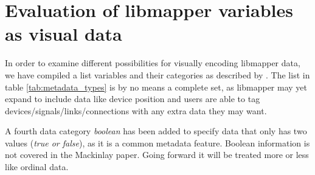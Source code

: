 
\section{Evaluation of libmapper variables as visual data} %
\label{sec:evaluation_of_libmapper_variables}

In order to examine different possibilities for visually encoding libmapper data, we have compiled a list variables and their categories as described by . The list in table \ref{tab:metadata_types} is by no means a complete set, as libmapper may yet expand to include data like device position and users are able to tag devices/signals/links/connections with any extra data they may want.

A fourth data category \emph{boolean} has been added to specify data that only has two values (\emph{true or false}), as it is a common metadata feature. Boolean information is not covered in the Mackinlay paper. Going forward it will be treated more or less like ordinal data.

